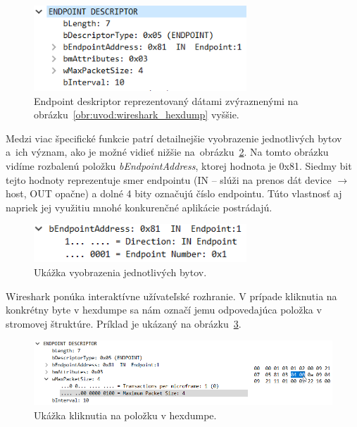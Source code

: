 \begin{figure}[!htb]
	\centering
	\includegraphics[width=8cm]{img/uvod_endpoint}
	\caption{Endpoint deskriptor reprezentovaný dátami zvýraznenými na obrázku~\ref{obr:uvod:wireshark_hexdump} vyššie.}
	\label{obr:uvod:endpoint}
\end{figure}

Medzi viac špecifické funkcie patrí detailnejšie vyobrazenie jednotlivých bytov a~ich význam, ako je možné vidieť nižšie na~obrázku~\ref{obr:uvod:byte_detail_foto}. Na tomto obrázku vidíme rozbalenú položku \textit{bEndpointAddress}, ktorej hodnota je 0x81. Siedmy bit tejto hodnoty reprezentuje smer endpointu (IN -- slúži na prenos dát device $\longrightarrow$ host, OUT opačne) a dolné 4 bity označujú číslo endpointu. Túto vlastnosť aj napriek jej využitiu mnohé konkurenčné aplikácie postrádajú.

\begin{figure}[!htb]
	\centering
	\includegraphics[width=8cm]{img/uvod_byte_detail}
	\caption{Ukážka vyobrazenia jednotlivých bytov.}
	\label{obr:uvod:byte_detail_foto}
\end{figure}

Wireshark ponúka interaktívne užívateľské rozhranie. V prípade kliknutia na konkrétny byte v hexdumpe sa nám označí jemu odpovedajúca položka v stromovej štruktúre. Príklad je ukázaný na obrázku~\ref{obr:uvod:hexdump_click}.

\begin{figure}[!htb]
	\centering
	\includegraphics[width=\textwidth]{img/uvod_wireshark_hexdump_click}
	\caption{Ukážka kliknutia na položku v hexdumpe.}
	\label{obr:uvod:hexdump_click}
\end{figure}

